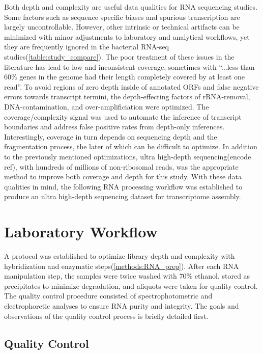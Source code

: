 Both depth and complexity are useful data qualities for RNA sequencing studies. Some factors such as sequence specific biases and spurious transcription are largely uncontrollable. However, other intrinsic or technical artifacts can be minimized with minor adjustments to laboratory and analytical workflows, yet they are frequently ignored in the bacterial RNA-seq studies(\ref{table:study_compare}). The poor treatment of these issues in the literature has lead to low and inconsistent coverage, sometimes with ``...less than 60\% genes in the genome had their length completely covered by at least one read''.\cite{115} To avoid regions of zero depth inside of annotated ORFs\cite{115} and false negative errors towards transcript termini, the depth-effecting factors of rRNA-removal, DNA-contamination, and over-amplificiation were optimized. The coverage/complexity signal was used to automate the inference of transcript boundaries and address false positive rates from depth-only inferences. Interestingly, coverage in turn depends on sequencing depth and the fragmentation process, the later of which can be difficult to optimize. In addition to the previously mentioned optimizations, ultra high-depth sequencing(encode ref), with hundreds of millions of non-ribosomal reads, was the appropriate method to improve both coverage and depth for this study. With these data qualities in mind, the following RNA processing workflow was established to produce an ultra high-depth sequencing dataset for transcriptome assembly.



\section{Laboratory Workflow}
A protocol was established to optimize library depth and complexity with hybridization and enzymatic steps(\ref{methods:RNA_prep}). After each RNA manipulation step, the samples were twice washed with 70\% ethanol, stored as precipitates to minimize degradation, and aliquots were taken for quality control. The quality control procedure consisted of spectrophotometric and electrophoretic analyses to ensure RNA purity and integrity. The goals and observations of the quality control process is briefly detailed first.

\subsection{Quality Control}
